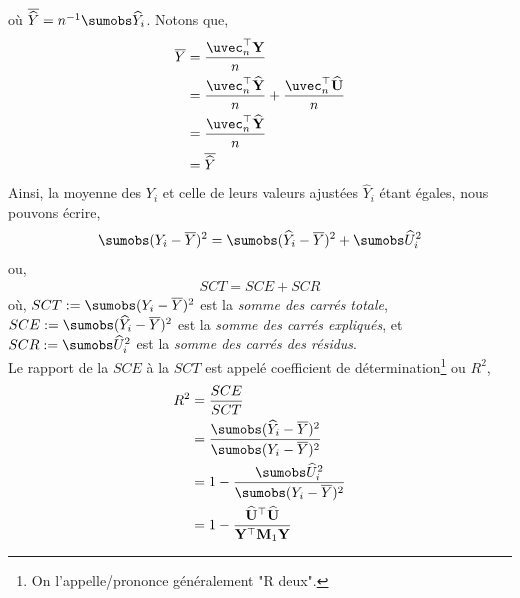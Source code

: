 où $\overline{\widehat{Y}} = n^{-1}\sumobs \widehat{Y}_i$. Notons que,
\begin{align*}
\overline{Y} &= \frac{\uvec_n^\top\mathbf{Y}}{n} \\
&= \frac{\uvec_n^\top\widehat{\mathbf{Y}}}{n}
+ \frac{\uvec_n^\top\widehat{\mathbf{U}}}{n}\\
& = \frac{\uvec_n^\top\widehat{\mathbf{Y}}}{n} \\
&= \overline{\widehat{Y}}
\end{align*}
Ainsi, la moyenne des $Y_i$ et celle de leurs valeurs ajustées $\widehat{Y}_i$ étant égales, nous pouvons écrire,
\begin{align*}
\sumobs(Y_i-\overline{Y})^2 = \sumobs(\widehat{Y}_i - \overline{Y})^2 + \sumobs \widehat{U}_i^2
\end{align*}
ou,
\begin{align*}
SCT = SCE + SCR
\end{align*}
où,
$SCT := \sumobs(Y_i-\overline{Y})^2$ est la \emph{somme des carrés totale},  $SCE :=  \sumobs(\widehat{Y}_i - \overline{Y})^2$  est la \emph{somme des carrés expliqués}, et $SCR:= \sumobs \widehat{U}_i^2$ est la \emph{somme des carrés des résidus}.\\
Le rapport de la $SCE$ à la $SCT$ est appelé coefficient de détermination\footnote{On l'appelle/prononce généralement "R deux".} ou $R^2$,
\begin{align*}
R^2 &= \frac{SCE}{SCT}\\
& = \frac{ \sumobs(\widehat{Y}_i - \overline{Y})^2}{\sumobs(Y_i-\overline{Y})^2}\\
&=1 - \frac{\sumobs \widehat{U}_i^2}{\sumobs(Y_i-\overline{Y})^2}\\
& = 1 - \frac{\widehat{\mathbf{U}}^\top\widehat{\mathbf{U}}}{\mathbf{Y}^\top\mathbf{M}_1\mathbf{Y}}
\end{align*}
